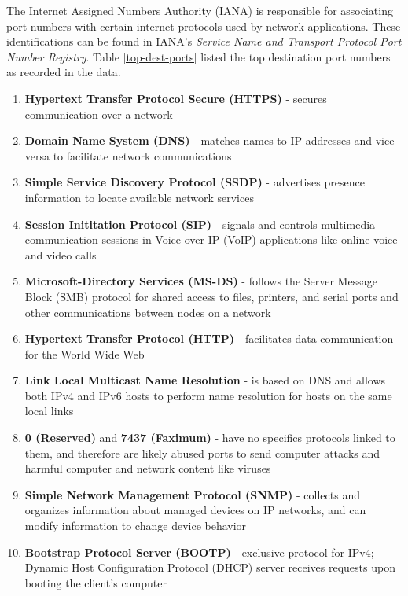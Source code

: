 \documentclass[journal]{IEEE/IEEEtran}
\begin{document}

The Internet Assigned Numbers Authority (IANA) is responsible for associating port numbers with certain internet protocols used by network applications. These identifications can be found in IANA's \textit{Service Name and Transport Protocol Port Number Registry}. Table \ref{top-dest-ports} listed the top destination port numbers as recorded in the data.


\begin{enumerate}

\item \textbf{Hypertext Transfer Protocol Secure (HTTPS)} - secures communication over a network

\item \textbf{Domain Name System (DNS)} - matches names to IP addresses and vice versa to facilitate network communications

\item \textbf{Simple Service Discovery Protocol (SSDP)} - advertises presence information to locate available network services

\item \textbf{Session Inititation Protocol (SIP)} - signals and controls multimedia communication sessions in Voice over IP (VoIP) applications like online voice and video calls

\item \textbf{Microsoft-Directory Services (MS-DS)} - follows the Server Message Block (SMB) protocol for shared access to files, printers, and serial ports and other communications between nodes on a network

\item \textbf{Hypertext Transfer Protocol (HTTP)} - facilitates data communication for the World Wide Web

\item \textbf{Link Local Multicast Name Resolution} - is based on DNS and allows both IPv4 and IPv6 hosts to perform name resolution for hosts on the same local links

\item \textbf{0 (Reserved)} and \textbf{7437 (Faximum)} - have no specifics protocols linked to them, and therefore are likely abused ports to send computer attacks and harmful computer and network content like viruses

\item \textbf{Simple Network Management Protocol (SNMP)} - collects and organizes information about managed devices on IP networks, and can modify information to change device behavior

\item \textbf{Bootstrap Protocol Server (BOOTP)} - exclusive protocol for IPv4; Dynamic Host Configuration Protocol (DHCP) server receives requests upon booting the client's computer

\end{enumerate}
\end{document}

